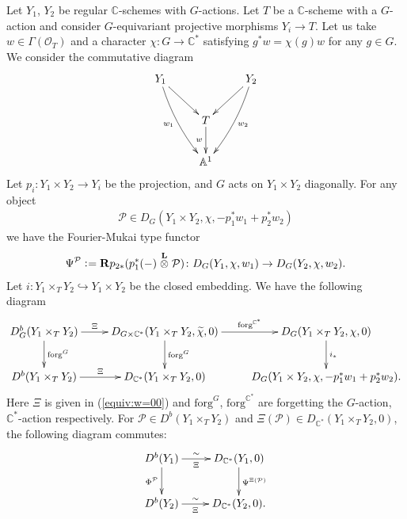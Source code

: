 \documentclass[11pt]{amsart}
\theoremstyle{plain}
\newcommand{\oO}{\mathcal{O}}
\newcommand{\pP}{\mathcal{P}}
\newcommand{\dotimes}{\stackrel{\textbf{L}}{\otimes}}
\newcommand{\dR}{\mathbf{R}}
\begin{document}
Let $Y_1$, $Y_2$ be 
regular $\mathbb{C}$-schemes with  
$G$-actions. 
Let $T$ be a $\mathbb{C}$-scheme 
with a $G$-action and 
consider $G$-equivariant 
projective morphisms
 $Y_i \to T$. 
 Let us take $w \in \Gamma(\oO_T)$
and a character $\chi \colon G \to \mathbb{C}^{\ast}$
 satisfying $g^{\ast}w=\chi(g) w$ for
any $g \in G$. 
We consider the commutative diagram
 \begin{align*}
 \xymatrix{
Y_1 \ar[rd]
\ar@/_5pt/[rdd]_-{w_1}  & & Y_2
\ar[ld]
\ar@/^5pt/[ldd]^-{w_2}\\
& T \ar[d]_-{w} &  \\
& \mathbb{A}^1 &
}
   \end{align*}
   Let $p_i \colon Y_1 \times Y_2 \to Y_i$ be the 
   projection, and $G$ acts on 
$Y_1 \times Y_2$ diagonally. 
   For any object
 \begin{align*}
 \pP \in D_G(Y_1 \times Y_2, \chi, -p_1^{\ast}w_1+p_2^{\ast}w_2)
 \end{align*}
 we have the Fourier-Mukai type functor
 \begin{align*}
 \Psi^{\pP} \cneq \dR p_{2\ast} (p_1^{\ast}(-) \dotimes \pP)
  \colon 
  D_G(Y_1, \chi, w_1) \to D_G(Y_2, \chi, w_2).
  \end{align*}
 Let $i \colon Y_1 \times_T Y_2 \hookrightarrow Y_1 \times Y_2$ be 
the closed embedding. We have the following diagram
\begin{align*}
\xymatrix{
D_G^b(Y_1 \times_T Y_2)  \ar[d]^-{\mathrm{forg}^G}
 \ar[r]^-{\Xi} &
 D_{G \times \mathbb{C}^{\ast}}(Y_1 \times_T Y_2, \widetilde{\chi}, 0) 
\ar[d]^-{\mathrm{forg}^{G}}  \ar[r]^-{\mathrm{forg}^{\mathbb{C}^{\ast}}} & 
D_{G}(Y_1 \times_T Y_2, \chi, 0) \ar[d]^-{i_{\ast}}
 \\
D^b(Y_1 \times_T Y_2) \ar[r]^-{\Xi} &
D_{\mathbb{C}^{\ast}}(Y_1 \times_T Y_2, 0) 
 &  D_{G}(Y_1 \times Y_2, \chi, -p_1^{\ast}w_1+p_2^{\ast}w_2).  
}
\end{align*}
Here $\Xi$ is given in (\ref{equiv:w=00}) and 
$\mathrm{forg}^G$, $\mathrm{forg}^{\mathbb{C}^{\ast}}$
are  
forgetting the $G$-action, $\mathbb{C}^{\ast}$-action respectively. 
For $\pP \in D^b(Y_1 \times_T Y_2)$
and $\Xi(\pP) \in D_{\mathbb{C}^{\ast}}(Y_1 \times_T Y_2, 0)$, 
the following diagram 
commutes: 
\begin{align}\label{commute:Xi}
\xymatrix{
D^b(Y_1) 
\ar[r]_-{\Xi}^-{\sim} \ar[d]_-{\Phi^{\pP}} & D_{\mathbb{C}^{\ast}}(Y_1, 0) 
\ar[d]^-{\Psi^{\Xi(\pP)}} \\
D^b(Y_2) \ar[r]_-{\Xi}^-{\sim} & D_{\mathbb{C}^{\ast}}(Y_2, 0). 
}
\end{align}
\end{document}
